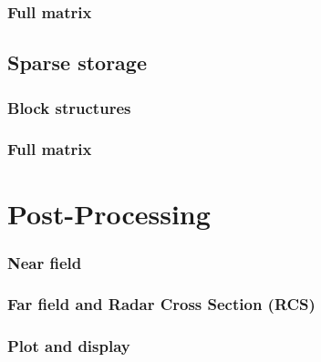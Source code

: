 \subsubsection{Full matrix}

\subsection{Sparse storage}
\subsubsection{Block structures}
\subsubsection{Full matrix}

\section{Post-Processing}
\subsubsection{Near field}
\subsubsection{Far field and Radar Cross Section (RCS)}
\subsubsection{Plot and display}

